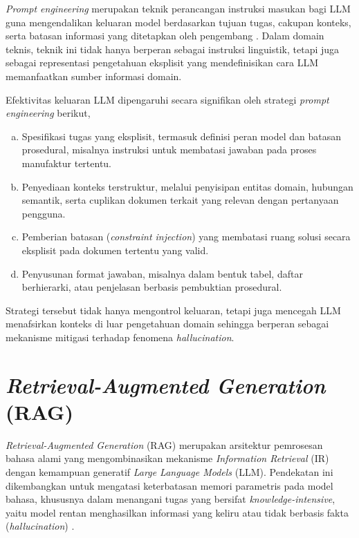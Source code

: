 \textit{Prompt engineering} merupakan teknik perancangan instruksi masukan bagi LLM guna mengendalikan keluaran model berdasarkan tujuan tugas, cakupan konteks, serta batasan informasi yang ditetapkan oleh pengembang \parencite{wan2025empowering}. Dalam domain teknis, teknik ini tidak hanya berperan sebagai instruksi linguistik, tetapi juga sebagai representasi pengetahuan eksplisit yang mendefinisikan cara LLM memanfaatkan sumber informasi domain.

Efektivitas keluaran LLM dipengaruhi secara signifikan oleh strategi \textit{prompt engineering} berikut,
\begin{enumerate}[a.]
    \item Spesifikasi tugas yang eksplisit, termasuk definisi peran model dan batasan prosedural, misalnya instruksi untuk membatasi jawaban pada proses manufaktur tertentu.
    \item Penyediaan konteks terstruktur, melalui penyisipan entitas domain, hubungan semantik, serta cuplikan dokumen terkait yang relevan dengan pertanyaan pengguna.
    \item Pemberian batasan (\textit{constraint injection}) yang membatasi ruang solusi secara eksplisit pada dokumen tertentu yang valid.
    \item Penyusunan format jawaban, misalnya dalam bentuk tabel, daftar berhierarki, atau penjelasan berbasis pembuktian prosedural.
\end{enumerate}

Strategi tersebut tidak hanya mengontrol keluaran, tetapi juga mencegah LLM menafsirkan konteks di luar pengetahuan domain sehingga berperan sebagai mekanisme mitigasi terhadap fenomena \textit{hallucination}.

\section{\textit{Retrieval-Augmented Generation} (RAG)}

\textit{Retrieval-Augmented Generation} (RAG) merupakan arsitektur pemrosesan bahasa alami yang mengombinasikan mekanisme \textit{Information Retrieval} (IR) dengan kemampuan generatif \textit{Large Language Models} (LLM). Pendekatan ini dikembangkan untuk mengatasi keterbatasan memori parametris pada model bahasa, khususnya dalam menangani tugas yang bersifat \textit{knowledge-intensive}, yaitu model rentan menghasilkan informasi yang keliru atau tidak berbasis fakta (\textit{hallucination}) \parencite{moreno2025rag}.

